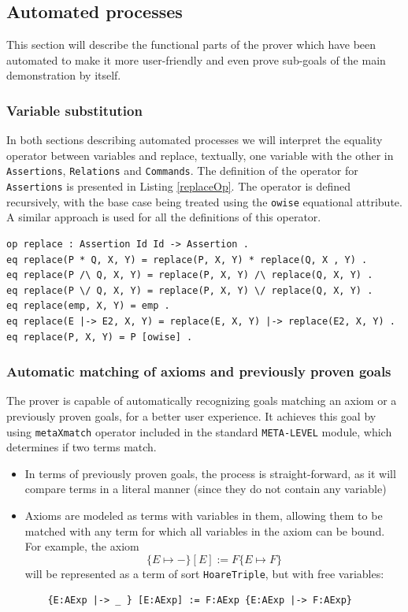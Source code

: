\documentclass[12pt,a4paper]{article}
\begin{document}
{\subsection{Automated processes}
This section will describe the functional parts of the prover which have been automated to make it more user-friendly and even prove sub-goals of the main demonstration by itself.
\subsubsection{Variable substitution}
In both sections describing automated processes we will interpret the equality operator between variables and replace, textually, one variable with the other in \texttt{Assertions}, \texttt{Relations} and \texttt{Commands}. The definition of the operator for \texttt{Assertions} is presented in Listing \ref{replaceOp}. The operator is defined recursively, with the base case being treated using the \texttt{owise} equational attribute. A similar approach is used for all the definitions of this operator. 
\begin{lstlisting}[label=replaceOp,caption=Replace operator definition for assertions]
op replace : Assertion Id Id -> Assertion .
eq replace(P * Q, X, Y) = replace(P, X, Y) * replace(Q, X , Y) .
eq replace(P /\ Q, X, Y) = replace(P, X, Y) /\ replace(Q, X, Y) .
eq replace(P \/ Q, X, Y) = replace(P, X, Y) \/ replace(Q, X, Y) .
eq replace(emp, X, Y) = emp .
eq replace(E |-> E2, X, Y) = replace(E, X, Y) |-> replace(E2, X, Y) .
eq replace(P, X, Y) = P [owise] .
\end{lstlisting}
\subsubsection{Automatic matching of axioms and previously proven goals}
The prover is capable of automatically recognizing goals matching an axiom or a previously proven goals, for a better user experience.
It achieves this goal by using \texttt{metaXmatch} operator included in the standard \texttt{META-LEVEL} module, which determines if two terms match. 
\begin{itemize}
	\item In terms of previously proven goals, the process is straight-forward, as it will compare terms in a literal manner (since they do not contain any variable)
	\item Axioms are modeled as terms with variables in them, allowing them to be matched with any term for which all variables in the axiom can be bound.
	For example, the axiom 
	\[
		\{E \mapsto -\} [E] := F \{E \mapsto F\}
	\]
	will be represented as a term of sort \texttt{HoareTriple}, but with free variables:
	\begin{lstlisting}
	{E:AExp |-> _ } [E:AExp] := F:AExp {E:AExp |-> F:AExp}\end{lstlisting}
	

\end{itemize}}
\end{document}
